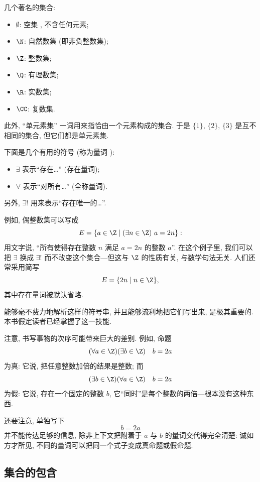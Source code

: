 几个著名的集合:
\begin{itemize}
	\item $\emptyset$: 空集%
, 不含任何元素;
	\item $\N$: 自然数集 (即非负整数集);
	\item $\Z$: 整数集;
	\item $\Q$: 有理数集;
	\item $\R$: 实数集;
	\item $\CC$: 复数集.
\end{itemize}
此外, ``单元素集''%
一词用来指恰由一个元素构成的集合. 于是 $\{1\}$, $\{2\}$, $\{3\}$ 是互不相同的集合, 但它们都是单元素集.

下面是几个有用的符号 (称为量词%
):
\begin{itemize}
	\item $\exists$ 表示``存在\ldots'' (存在量词);
	\item $\forall$ 表示``对所有\ldots'' (全称量词).
\end{itemize}
另外, $\exists!$ 用来表示``存在唯一的\ldots''.

例如, 偶整数集可以写成
\[
	E = \{a \in \Z \mid (\exists n \in \Z)\ a = 2n\}:
\]
用文字说, ``所有使得存在整数 $n$ 满足 $a = 2n$ 的整数 $a$''. 在这个例子里, 我们可以把 $\exists$ 换成 $\exists!$ 而不改变这个集合---但这与 $\Z$ 的性质有关, 与数学句法无关. 人们还常采用简写
\[
	E = \{2n \mid n \in \Z\},
\]
其中存在量词被默认省略.

能够毫不费力地解析这样的符号串, 并且能够流利地把它们写出来, 是极其重要的. 本书假定读者已经掌握了这一技能.

注意, 书写事物的次序可能带来巨大的差别. 例如, 命题
\[
	(\forall a \in \Z) (\exists b \in \Z) \quad b = 2a
\]
为真: 它说, 把任意整数加倍的结果是整数; 而
\[
	(\exists b \in \Z) (\forall a \in \Z) \quad b = 2a
\]
为假: 它说, 存在一个固定的整数 $b$, 它``同时''是每个整数的两倍---根本没有这种东西.

还要注意, 单独写下
\[
	b = 2a
\]
并不能传达足够的信息, 除非上下文把附着于 $a$ 与 $b$ 的量词交代得完全清楚: 诚如方才所见, 不同的量词可以把同一个式子变成真命题或假命题.

\subsection{集合的包含}
\label{subsec:inclusion}

